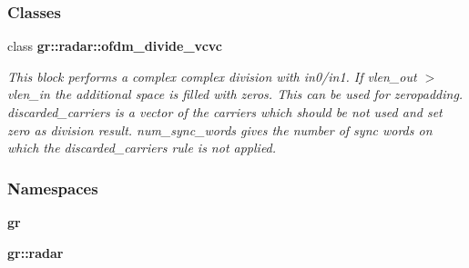 \subsubsection*{Classes}
\begin{DoxyCompactItemize}
\item 
class {\bf gr\+::radar\+::ofdm\+\_\+divide\+\_\+vcvc}
\begin{DoxyCompactList}\small\item\em This block performs a complex complex division with in0/in1. If vlen\+\_\+out $>$ vlen\+\_\+in the additional space is filled with zeros. This can be used for zeropadding. discarded\+\_\+carriers is a vector of the carriers which should be not used and set zero as division result. num\+\_\+sync\+\_\+words gives the number of sync words on which the discarded\+\_\+carriers rule is not applied. \end{DoxyCompactList}\end{DoxyCompactItemize}
\subsubsection*{Namespaces}
\begin{DoxyCompactItemize}
\item 
 {\bf gr}
\item 
 {\bf gr\+::radar}
\end{DoxyCompactItemize}
